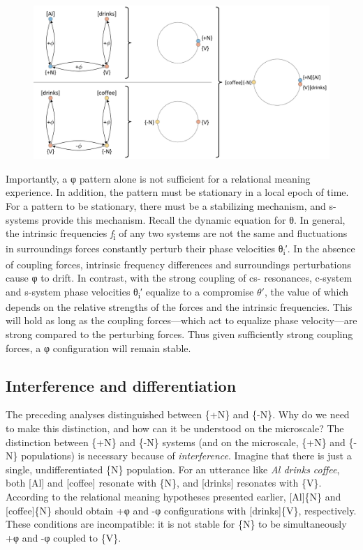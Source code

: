   
\begin{figure}
\includegraphics[width=\textwidth]{figures/Tilsen-img22.png}
\caption{\missingcaption}
\label{fig:}
\end{figure}
 

  Importantly, a φ pattern alone is not sufficient for a relational meaning experience. In addition, the pattern must be stationary in a local epoch of time. For a pattern to be stationary, there must be a stabilizing mechanism, and s-systems provide this mechanism. Recall the dynamic equation for θ. In general, the intrinsic frequencies \textit{f}\textsubscript{i} of any two systems are not the same and fluctuations in surroundings forces constantly perturb their phase velocities θ\textsubscript{i}′. In the absence of coupling forces, intrinsic frequency differences and surroundings perturbations cause φ to drift. In contrast, with the strong coupling of cs- resonances, c-system and s-system phase velocities θ\textsubscript{i}′ equalize to a compromise $\theta ′$, the value of which depends on the relative strengths of the forces and the intrinsic frequencies. This will hold as long as the coupling forces—which act to equalize phase velocity—are strong compared to the perturbing forces. Thus given sufficiently strong coupling forces, a φ configuration will remain stable.

\subsection{Interference and differentiation}

The preceding analyses distinguished between \{+N\} and \{-N\}. Why do we need to make this distinction, and how can it be understood on the microscale? The distinction between \{+N\} and \{-N\} systems (and on the microscale, \{+N\} and \{-N\} populations) is necessary because of \textit{interference}. Imagine that there is just a single, undifferentiated \{N\} population. For an utterance like \textit{Al drinks coffee}, both [Al] and [coffee] resonate with \{N\}, and [drinks] resonates with \{V\}. According to the relational meaning hypotheses presented earlier, [Al]\{N\} and [coffee]\{N\} should obtain +φ and -φ configurations with [drinks]\{V\}, respectively. These conditions are incompatible: it is not stable for \{N\} to be simultaneously +φ and -φ coupled to \{V\}.

